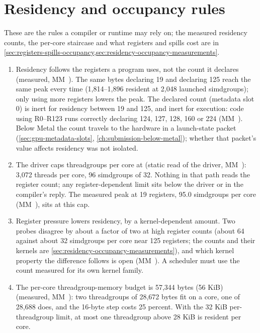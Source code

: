 \section{Residency and occupancy rules}\label{sec:residency-occupancy-rules}

These are the rules a compiler or runtime may rely on; the measured residency counts, the per-core staircase and what
registers and spills cost are in \cref{sec:registers-spills-occupancy,sec:residency-occupancy-measurements}.

\begin{enumerate}
\def\labelenumi{\arabic{enumi}.}
\item Residency follows the registers a program uses, not the count it declares (measured, MM~). The same bytes
  declaring 19 and declaring 125 reach the same peak every time (1,814–1,896 resident at 2,048 launched simdgroups); only
  using more registers lowers the peak. The declared count (metadata slot 0) is inert for residency between 19 and
  125, and inert for execution: code using R0–R123 runs correctly declaring 124, 127, 128, 160 or 224 (MM~).
  Below Metal the count travels to the hardware in a launch-state packet (\cref{sec:gpu-metadata-slots}, \cref{ch:submission-below-metal}); whether that
  packet's value affects residency was not isolated.
\item The driver caps threadgroups per core at  (static read of the driver,
  MM~): 3,072 threads per core, 96 simdgroups of 32. Nothing in that path reads the register count; any
  register-dependent limit sits below the driver or in the compiler's reply. The measured peak at 19 registers,
  95.0 simdgroups per core (MM~), sits at this cap.
\item Register pressure lowers residency, by a kernel-dependent amount. Two probes disagree by about a factor of two
  at high register counts (about 64 against about 32 simdgroups per core near 125 registers; the counts and their
  kernels are \cref{sec:residency-occupancy-measurements}), and which kernel property the difference follows is open (MM~). A scheduler must use
  the count measured for its own kernel family.
\item The per-core threadgroup-memory budget is 57,344 bytes (56 KiB) (measured, MM~): two threadgroups of
  28,672 bytes fit on a core, one of 28,688 does, and the 16-byte step costs 25 percent. With the 32 KiB per-threadgroup
  limit, at most one threadgroup above 28 KiB is resident per core.

\end{enumerate}
